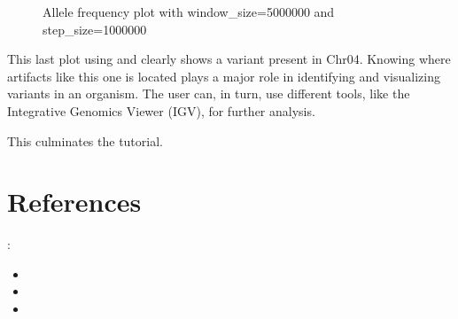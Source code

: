 \documentclass[letterpaper,10pt,english]{sphinxhowto}
\begin{document}
\begin{figure}[htbp]
\centering
\capstart

\noindent{}
\caption{Allele frequency plot with window\_size=5000000 and step\_size=1000000}\label{\detokenize{index:id4}}\end{figure}

\sphinxAtStartPar
This last plot using  and  clearly shows a variant present in Chr04. Knowing where artifacts like this one is located plays a major role in identifying and visualizing variants in an organism. The user can, in turn, use different tools, like the Integrative Genomics Viewer (IGV), for further analysis.

\sphinxAtStartPar
This culminates the tutorial.


\section{References}
\label{\detokenize{index:references}}
\sphinxAtStartPar
{}:
\begin{itemize}
\item {} 
\sphinxAtStartPar
{}

\item {} 
\sphinxAtStartPar
{}

\item {} 
\sphinxAtStartPar
{}

\end{itemize}



\renewcommand{\indexname}{Index}
\printindex
\end{document}

